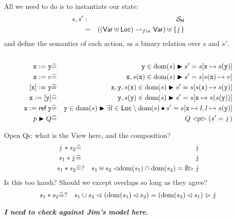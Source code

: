 All we need to do is to instantiate our state:
\begin{eqnarray*}
  s,s' &:& \mathcal{S}_{\mathsf{H}}
\\ &=& ((\mathsf{Var} \uplus \mathsf{Loc}) \rightharpoonup_{fin} \mathsf{Var}) \uplus \{\lightning\}
\end{eqnarray*}
and define the semantics of each action,
as a binary relation over $s$ and $s'$.
\begin{eqnarray*}
\\ \mathtt{x}:=\mathtt{y}
   &\widehat=& \mathtt{y} \in \mathrm{dom}(s) \blacktriangleright
           s' = s[\mathtt{x} \mapsto s(\mathtt{y})]
\\ \mathtt{x}:=v
   &\widehat=& \mathtt{x},s(\mathtt{x}) \in \mathrm{dom}(s) \blacktriangleright
           s' = s[s(\mathtt{x}) \mapsto v]
\\ ~[\mathtt{x}]:=\mathtt{y}
   &\widehat=& \mathtt{x},\mathtt{y},s(\mathtt{x}) \in \mathrm{dom}(s) \blacktriangleright
           s' = s[s(\mathtt{x}) \mapsto s(\mathtt{y})]
\\ \mathtt{x}:=[\mathtt{y}]
   &\widehat=& \mathtt{y},s(\mathtt{y}) \in \mathrm{dom}(s) \blacktriangleright
           s' = s[\mathtt{x} \mapsto s(s(\mathtt{y}))]
\\ \mathtt{x}:=\mathop{\mathsf{ref}}\mathtt{y}
              &\widehat=& \mathtt{y} \in \mathrm{dom}(s) \blacktriangleright
              \exists l \in \mathsf{Loc} \setminus \mathrm{dom}(s) \bullet
               s' = s[\mathtt{x} \mapsto l,l \mapsto s(\mathtt{y})]
\\ p \blacktriangleright Q &\widehat=& Q \mathrel{\lhd{p}\rhd} ( s'=\lightning )
\end{eqnarray*}

Open Qs: what is the View here, and the composition?
\begin{eqnarray*}
   \lightning * s_2 &\widehat=& \lightning
\\ s_1 * \lightning &\widehat=& \lightning
\\  s_1 * s_2
   &\widehat=?& s_1
   \uplus s_2
   \mathrel{\lhd{\mathrm{dom}(s_1)\cap\mathrm{dom}(s_2)=\emptyset}\rhd}
   \lightning
\end{eqnarray*}
Is this too harsh?
Should we except overlaps so long as they agree?
\begin{eqnarray*}
   s_1 * s_2
   &\widehat=?& s_1
   \cup s_2
   \mathrel{\lhd{~(\mathrm{dom}(s_1)\lhd s_2) = (\mathrm{dom}(s_2)\lhd s_1)~}\rhd}
   \lightning
\end{eqnarray*}

\textbf{\emph{I need to check against Jim's model here.}}
